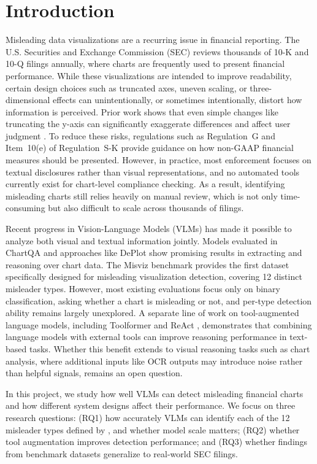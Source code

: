 \section{Introduction}

Misleading data visualizations are a recurring issue in financial
reporting. The U.S. Securities and Exchange Commission (SEC) reviews
thousands of 10-K and 10-Q filings annually, where charts are frequently
used to present financial performance. While these visualizations are
intended to improve readability, certain design choices such as
truncated axes, uneven scaling, or three-dimensional effects can
unintentionally, or sometimes intentionally, distort how information is
perceived. Prior work shows that even simple changes like truncating the
y-axis can significantly exaggerate differences and affect user judgment
\cite{pandey2015deceptive}. To reduce these risks, regulations such as
Regulation~G and Item~10(e) of Regulation~S-K provide guidance on how
non-GAAP financial measures should be presented. However, in practice,
most enforcement focuses on textual disclosures rather than visual
representations, and no automated tools currently exist for chart-level
compliance checking. As a result, identifying misleading charts still
relies heavily on manual review, which is not only time-consuming but
also difficult to scale across thousands of filings.

Recent progress in Vision-Language Models (VLMs) has made it possible to
analyze both visual and textual information jointly. Models evaluated in
ChartQA \cite{masry2022chartqa} and approaches like DePlot
\cite{liu2023deplot} show promising results in extracting and reasoning
over chart data. The Misviz benchmark \cite{tonglet2025misviz} provides
the first dataset specifically designed for misleading visualization
detection, covering 12 distinct misleader types. However, most existing
evaluations focus only on binary classification, asking whether a chart
is misleading or not, and per-type detection ability remains largely
unexplored. A separate line of work on tool-augmented language models,
including Toolformer \cite{schick2023toolformer} and ReAct
\cite{yao2023react}, demonstrates that combining language models with
external tools can improve reasoning performance in text-based tasks.
Whether this benefit extends to visual reasoning tasks such as chart
analysis, where additional inputs like OCR outputs may introduce noise
rather than helpful signals, remains an open question.

In this project, we study how well VLMs can detect misleading financial
charts and how different system designs affect their performance. We
focus on three research questions: (RQ1) how accurately VLMs can
identify each of the 12 misleader types defined by \citet{tonglet2025misviz},
and whether model scale matters; (RQ2) whether tool augmentation
improves detection performance; and (RQ3) whether findings from
benchmark datasets generalize to real-world SEC filings.

